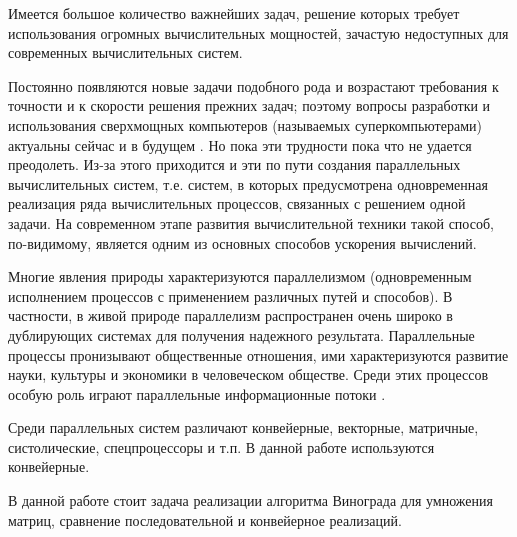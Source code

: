 \Introduction

Имеется большое количество важнейших задач, решение которых требует использования огромных вычислительных мощностей, зачастую недоступных для современных вычислительных систем.

Постоянно появляются новые задачи подобного рода и возрастают требования к точности и к скорости решения прежних задач; поэтому вопросы разработки и использования сверхмощных компьютеров (называемых суперкомпьютерами) актуальны сейчас и в будущем \cite{Voevodin}. Но пока эти трудности пока что не удается преодолеть. Из-за этого приходится и эти по пути создания параллельных вычислительных систем, т.е. систем, в которых предусмотрена одновременная реализация ряда вычислительных процессов, связанных с решением одной задачи. На современном этапе развития вычислительной техники такой способ, по-видимому, является одним из основных способов ускорения вычислений.

Многие явления природы характеризуются параллелизмом (одновременным исполнением процессов с применением различных путей и способов). В частности, в живой природе параллелизм распространен очень широко в дублирующих системах для получения надежного результата. Параллельные процессы пронизывают общественные отношения, ими характеризуются развитие науки, культуры и экономики в человеческом обществе. Среди этих процессов особую роль играют параллельные информационные потоки \cite{Conveer}.

Среди параллельных систем различают конвейерные, векторные, матричные, систолические, спецпроцессоры и т.п. В данной работе используются конвейерные.

В данной работе стоит задача реализации алгоритма Винограда для умножения матриц, сравнение последовательной и конвейерное реализаций.

